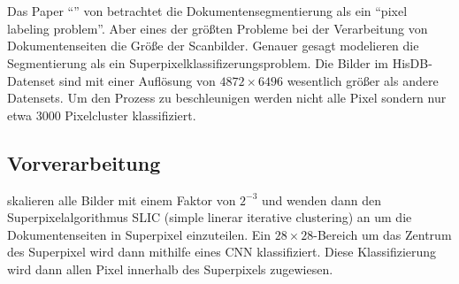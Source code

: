 \section{\textcite{ChenConvolutionalNeuralNetworks2017}}
Das Paper ``'' von \citeauthor*{ChenConvolutionalNeuralNetworks2017} betrachtet die Dokumentensegmentierung als ein ``pixel labeling problem''. 
Aber eines der größten Probleme bei der Verarbeitung von Dokumentenseiten die Größe der Scanbilder.
Genauer gesagt modelieren \citeauthor{ChenConvolutionalNeuralNetworks2017}  die Segmentierung als ein Superpixelklassifizerungsproblem.
Die Bilder im HisDB-Datenset sind mit einer Auflösung von \(4872 \times 6496\) wesentlich größer als andere Datensets.
Um den Prozess zu beschleunigen werden nicht alle Pixel sondern nur etwa 3000 Pixelcluster klassifiziert. 

\subsection{Vorverarbeitung}
\citeauthor{ChenConvolutionalNeuralNetworks2017} skalieren alle Bilder mit einem Faktor von  \(2^{-3}\) und wenden dann den Superpixelalgorithmus SLIC (simple linerar iterative clustering) an \parencite{AchantaSLICSuperpixels2010} um die Dokumentenseiten in Superpixel einzuteilen.
Ein \(28 \times 28\)-Bereich um das Zentrum des Superpixel wird dann mithilfe eines CNN
klassifiziert. Diese Klassifizierung wird dann allen Pixel innerhalb des Superpixels zugewiesen.


